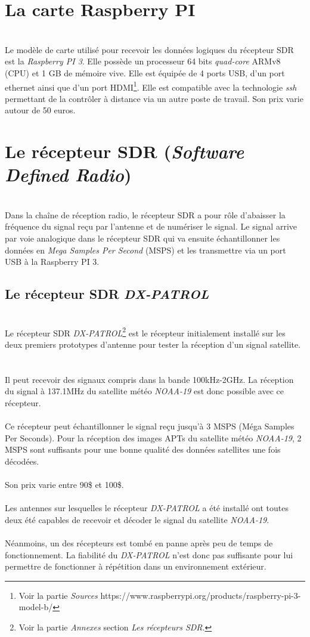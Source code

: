 \documentclass[12pt,fleqn]{book} %
\begin{document}
\section{La carte Raspberry PI}
~\\\indent Le modèle de carte utilisé pour recevoir les données logiques du récepteur SDR est la \emph{Raspberry PI 3}. Elle possède un processeur 64 bits \emph{quad-core} ARMv8 (CPU) et 1 GB de mémoire vive. Elle est équipée de 4 ports USB, d'un port ethernet ainsi que d'un port HDMI\footnote{Voir la partie \emph{Sources} https://www.raspberrypi.org/products/raspberry-pi-3-model-b/}. Elle est compatible avec la technologie \emph{ssh} permettant de la contrôler à distance via un autre poste de travail. Son prix varie autour de 50 euros.
\section{Le récepteur SDR (\emph{Software Defined Radio})}
~\\\indent Dans la chaîne de réception radio, le récepteur SDR a pour rôle d'abaisser la fréquence du signal reçu par l'antenne et de numériser le signal. Le signal arrive par voie analogique dans le récepteur SDR qui va ensuite échantillonner les données en \emph{Mega Samples Per Second} (MSPS) et les transmettre via un port USB à la Raspberry PI 3.
\subsection{Le récepteur SDR \emph{DX-PATROL}}
~\\Le récepteur SDR \emph{DX-PATROL}\footnote{Voir la partie \emph{Annexes} section \emph{Les récepteurs SDR}.} est le récepteur initialement installé sur les deux premiers prototypes d'antenne pour tester la réception d'un signal satellite. 
~\\\\Il peut recevoir des signaux compris dans la bande 100kHz-2GHz. La réception du signal à 137.1MHz du satellite météo \emph{NOAA-19} est donc possible avec ce récepteur. 
~\\\\Ce récepteur peut échantillonner le signal reçu jusqu'à 3 MSPS (Méga Samples Per Seconds). Pour la réception des images APTs du satellite météo \emph{NOAA-19}, 2 MSPS sont suffisants pour une bonne qualité des données satellites une fois décodées.
~\\\\Son prix varie entre 90\$ et 100\$.
~\\\\Les antennes sur lesquelles le récepteur \emph{DX-PATROL} a été installé ont toutes deux été capables de recevoir et décoder le signal du satellite \emph{NOAA-19}.
~\\\\Néanmoins, un des récepteurs est tombé en panne après peu de temps de fonctionnement. La fiabilité du \emph{DX-PATROL} n'est donc pas suffisante pour lui permettre de fonctionner à répétition dans un environnement extérieur.
\end{document}

